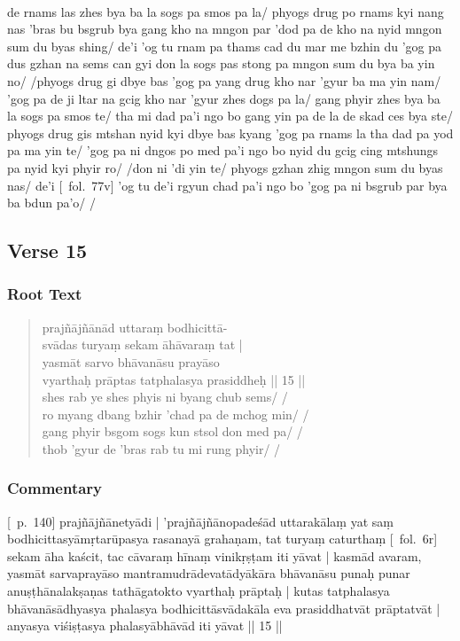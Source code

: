 \documentclass[12pt]{article}
\begin{document}
\textbf{\TVB}\\
de rnams las zhes bya ba la sogs pa smos pa la/ phyogs drug po rnams kyi nang nas 'bras bu bsgrub bya gang kho na mngon par 'dod pa de kho na nyid mngon sum du byas shing/ de'i 'og tu rnam pa thams cad du mar me bzhin du 'gog pa dus gzhan na sems can gyi don la sogs pas stong pa mngon sum du bya ba yin no/ /phyogs drug gi dbye bas 'gog pa yang drug kho nar 'gyur ba ma yin nam/ 'gog pa de ji ltar na gcig kho nar 'gyur zhes dogs pa la/ gang phyir zhes bya ba la sogs pa smos te/ tha mi dad pa'i ngo bo gang yin pa de la de skad ces bya ste/ phyogs drug gis mtshan nyid kyi dbye bas kyang 'gog pa rnams la tha dad pa yod pa ma yin te/ 'gog pa ni dngos po med pa'i ngo bo nyid du gcig cing mtshungs pa nyid kyi phyir ro/ /don ni 'di yin te/ phyogs gzhan zhig mngon sum du byas nas/ de'i [\TVB\ fol.\ 77v] 'og tu de'i rgyun chad pa'i ngo bo 'gog pa ni bsgrub par bya ba bdun pa'o/ /

\subsection{Verse 15}
\subsubsection{Root Text}
\begin{quote}
	prajñājñānād uttaraṃ bodhicittā-\\
	svādas turyaṃ sekam\footnoteB{
		sekam] \EDD ; seṣam \MS
	} āhāvaraṃ tat |\\
	yasmāt\footnoteB{
		yasmāt] \EDD ; paścāt \MS
	} sarvo bhāvanāsu prayāso \\
	vyarthaḥ prāptas tatphalasya prasiddheḥ || 15 ||\\

	shes rab ye shes phyis ni byang chub sems/ /\\
	ro myang dbang bzhir 'chad pa de mchog min/ /\\
	gang phyir bsgom sogs kun stsol don med pa/ /\\
	thob 'gyur de 'bras rab tu mi rung phyir/ /
\end{quote}

\subsubsection{Commentary}
[\EDD\ p.\ 140] prajñājñānetyādi | 'prajñājñānopadeśād uttarakālaṃ yat saṃ bodhicittasyāmṛtarūpasya rasanayā grahaṇam, tat turyaṃ caturthaṃ [\MS\ fol.\ 6r] sekam āha kaścit, tac cāvaraṃ hīnaṃ vinikṛṣṭam iti yāvat | kasmād avaram, yasmāt sarvaprayāso mantramudrādevatādyākāra bhāvanāsu punaḥ punar anuṣṭhānalakṣaṇas tathāgatokto vyarthaḥ prāptaḥ | kutas tatphalasya bhāvanāsādhyasya phalasya bodhicittāsvādakāla eva prasiddhatvāt prāptatvāt | anyasya viśiṣṭasya phalasyābhāvād iti yāvat || 15 ||\\
\end{document}
